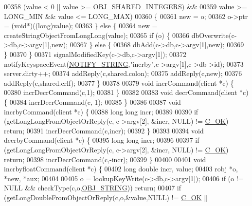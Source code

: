 \begin{DoxyCode}
{00358         (value < 0 || value >= \hyperlink{server_8h_a311fc8b18b93af94e1ad418f1386b519}{OBJ\_SHARED\_INTEGERS}) &&
00359         value >= LONG\_MIN && value <= LONG\_MAX)
00360     \{
00361         \textcolor{keyword}{new} = o;
00362         o->ptr = (\textcolor{keywordtype}{void}*)((\textcolor{keywordtype}{long})value);
00363     \} \textcolor{keywordflow}{else} \{
00364         \textcolor{keyword}{new} = createStringObjectFromLongLong(value);
00365         \textcolor{keywordflow}{if} (o) \{
00366             dbOverwrite(c->db,c->argv[1],\textcolor{keyword}{new});
00367         \} \textcolor{keywordflow}{else} \{
00368             dbAdd(c->db,c->argv[1],\textcolor{keyword}{new});
00369         \}
00370     \}
00371     signalModifiedKey(c->db,c->argv[1]);
00372     notifyKeyspaceEvent(\hyperlink{server_8h_a1902292b73b71baa65d86db2d61b47ce}{NOTIFY\_STRING},\textcolor{stringliteral}{"incrby"},c->argv[1],c->db->id);
00373     server.dirty++;
00374     addReply(c,shared.colon);
00375     addReply(c,\textcolor{keyword}{new});
00376     addReply(c,shared.crlf);
00377 \}
00378 
00379 \textcolor{keywordtype}{void} incrCommand(client *c) \{
00380     incrDecrCommand(c,1);
00381 \}
00382 
00383 \textcolor{keywordtype}{void} decrCommand(client *c) \{
00384     incrDecrCommand(c,-1);
00385 \}
00386 
00387 \textcolor{keywordtype}{void} incrbyCommand(client *c) \{
00388     \textcolor{keywordtype}{long} \textcolor{keywordtype}{long} incr;
00389 
00390     \textcolor{keywordflow}{if} (getLongLongFromObjectOrReply(c, c->argv[2], &incr, NULL) != \hyperlink{server_8h_a303769ef1065076e68731584e758d3e1}{C\_OK}) \textcolor{keywordflow}{return};
00391     incrDecrCommand(c,incr);
00392 \}
00393 
00394 \textcolor{keywordtype}{void} decrbyCommand(client *c) \{
00395     \textcolor{keywordtype}{long} \textcolor{keywordtype}{long} incr;
00396 
00397     \textcolor{keywordflow}{if} (getLongLongFromObjectOrReply(c, c->argv[2], &incr, NULL) != \hyperlink{server_8h_a303769ef1065076e68731584e758d3e1}{C\_OK}) \textcolor{keywordflow}{return};
00398     incrDecrCommand(c,-incr);
00399 \}
00400 
00401 \textcolor{keywordtype}{void} incrbyfloatCommand(client *c) \{
00402     \textcolor{keywordtype}{long} \textcolor{keywordtype}{double} incr, value;
00403     robj *o, *\textcolor{keyword}{new}, *aux;
00404 
00405     o = lookupKeyWrite(c->db,c->argv[1]);
00406     \textcolor{keywordflow}{if} (o != NULL && checkType(c,o,\hyperlink{server_8h_a65236ea160f69cdef33ec942092af88f}{OBJ\_STRING})) \textcolor{keywordflow}{return};
00407     \textcolor{keywordflow}{if} (getLongDoubleFromObjectOrReply(c,o,&value,NULL) != \hyperlink{server_8h_a303769ef1065076e68731584e758d3e1}{C\_OK} ||
}
\end{DoxyCode}
